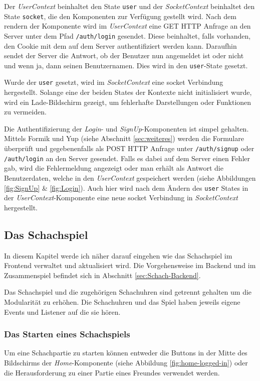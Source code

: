 Der \textit{UserContext} beinhaltet den State \verb|user| und der \textit{SocketContext} beinhaltet den State \verb|socket|, die den Komponenten zur Verfügung gestellt wird.
Nach dem rendern der Komponente wird im \textit{UserContext} eine GET HTTP Anfrage an den Server unter dem Pfad \verb|/auth/login| gesendet. Diese beinhaltet, falls vorhanden, den Cookie mit dem auf dem Server authentifiziert werden kann. Daraufhin sendet der Server die Antwort, ob der Benutzer nun angemeldet ist oder nicht und wenn ja, dann seinen Benutzernamen.
Dies wird in den \verb|user|-State gesetzt.

Wurde der \verb|user| gesetzt, wird im \textit{SocketContext} eine socket Verbindung hergestellt. Solange eine der beiden States der Kontexte nicht initialisiert wurde, wird ein Lade-Bildschirm gezeigt, um fehlerhafte Darstellungen oder Funktionen zu vermeiden.

Die Authentifizierung der \textit{Login}- und \textit{SignUp}-Komponenten ist simpel gehalten. Mittels Formik und Yup (siehe Abschnitt \ref{sec:weiteres}) werden die Formulare überprüft und gegebenenfalls als POST HTTP Anfrage unter \verb|/auth/signup| oder \verb|/auth/login| an den Server gesendet. Falls es dabei auf dem Server einen Fehler gab, wird die Fehlermeldung angezeigt oder man erhält als Antwort die Benutzerdaten, welche in den \textit{UserContext} gespeichert werden (siehe Abbildungen \ref{fig:SignUp} \& \ref{fig:Login}). Auch hier wird nach dem Ändern des \verb|user| States in der \textit{UserContext}-Komponente eine neue socket Verbindung in \textit{SocketContext} hergestellt.
        
        \subsection{Das Schachspiel}
        \label{sec:Schachspiel}
        In diesem Kapitel werde ich näher darauf eingehen wie das Schachspiel im Frontend verwaltet und aktualisiert wird. Die Vorgehensweise im Backend und im Zusammenspiel befindet sich in Abschnitt \ref{sec:Schach-Backend}.
        
Das Schachspiel und die zugehörigen Schachuhren sind getrennt gehalten um die Modularität zu erhöhen. Die Schachuhren und das Spiel haben jeweils eigene Events und Listener auf die sie hören.
		\subsubsection{Das Starten eines Schachspiels}
		\label{sec:Frontend-Schach-Start}
Um eine Schachpartie zu starten können entweder die Buttons in der Mitte des Bildschirms der \textit{Home}-Komponente (siehe Abbildung \ref{fig:home-logged-in}) oder die Herausforderung zu einer Partie eines Freundes verwendet werden.

